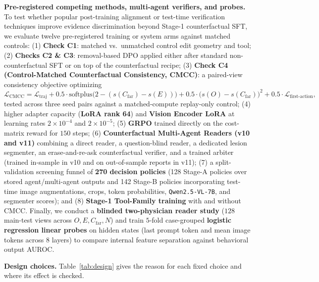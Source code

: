\documentclass{article} %
\begin{document}
\textbf{Pre-registered competing methods, multi-agent verifiers, and probes.} To test whether popular post-training alignment or test-time verification techniques improve evidence discrimination beyond Stage-1 counterfactual SFT, we evaluate twelve pre-registered training or system arms against matched controls:
(1) \textbf{Check C1}: matched vs.\ unmatched control edit geometry and tool;
(2) \textbf{Checks C2 \& C3}: removal-based DPO \citep{rafailov2023dpo} applied either after standard non-counterfactual SFT or on top of the counterfactual recipe;
(3) \textbf{Check C4 (Control-Matched Counterfactual Consistency, CMCC)}: a paired-view consistency objective optimizing
\begin{equation}
\label{eq:cmcc}
\mathcal{L}_{\text{CMCC}} = \mathcal{L}_{\text{traj}} + 0.5 \cdot \text{softplus}\big(2 - (s(C_{\text{far}}) - s(E))\big) + 0.5 \cdot \big(s(O) - s(C_{\text{far}})\big)^2 + 0.5 \cdot \mathcal{L}_{\text{first-action}},
\end{equation}
tested across three seed pairs against a matched-compute replay-only control;
(4) higher adapter capacity (\textbf{LoRA rank 64}) and \textbf{Vision Encoder LoRA} at learning rates $2\times 10^{-4}$ and $2\times 10^{-5}$;
(5) \textbf{GRPO} \citep{shao2024deepseekmath} trained directly on the cost-matrix reward for $150$ steps;
(6) \textbf{Counterfactual Multi-Agent Readers (v10 and v11)} combining a direct reader, a question-blind reader, a dedicated lesion segmenter, an erase-and-re-ask counterfactual verifier, and a trained arbiter (trained in-sample in v10 and on out-of-sample reports in v11);
(7) a split-validation screening funnel of \textbf{270 decision policies} (128 Stage-A policies over stored agent/multi-agent outputs and 142 Stage-B policies incorporating test-time image augmentations, crops, token probabilities, \texttt{Qwen2.5-VL-7B}, and segmenter scores); and
(8) \textbf{Stage-1 Tool-Family training} with and without CMCC.
Finally, we conduct a \textbf{blinded two-physician reader study} ($128$ main-test views across $O, E, C_{\text{far}}, N$) and train $5$-fold case-grouped \textbf{logistic regression linear probes} \citep{alain2016understanding} on hidden states (last prompt token and mean image tokens across $8$ layers) to compare internal feature separation against behavioral output AUROC.

\textbf{Design choices.} Table~\ref{tab:design} gives the reason for each fixed choice and where its effect is checked.
\end{document}
